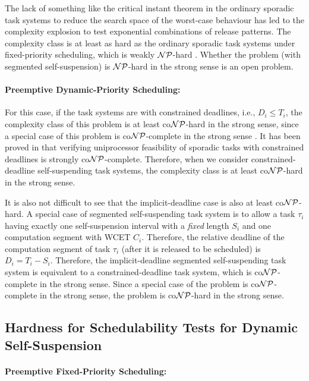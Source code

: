 The lack of something like the critical instant theorem in the ordinary sporadic task systems to reduce the search space of the worst-case behaviour has led to the complexity explosion to test exponential combinations of release patterns. The complexity class is at least as hard as the ordinary sporadic task systems under fixed-priority scheduling, which is weakly ${\cal NP}$-hard  \cite{EisenbrandR08}. Whether the problem (with segmented self-suspension) is ${\cal NP}$-hard in the strong sense is an open problem.

\paragraph{Preemptive Dynamic-Priority Scheduling:} 
For this case, if the task systems are with constrained deadlines, i.e., $D_i \leq T_i$, the complexity class of this problem is at least co${\cal NP}$-hard in the strong sense, since a special case of this problem is co${\cal NP}$-complete in the strong sense \cite{DBLP:conf/ecrts/Ekberg015}. It has been proved in \cite{DBLP:conf/ecrts/Ekberg015} that verifying uniprocessor feasibility of sporadic tasks with constrained deadlines is strongly co${\cal NP}$-complete.  Therefore, when we consider constrained-deadline self-suspending task systems, the complexity class is at least co${\cal NP}$-hard in the strong sense.

It is also not difficult to see that the implicit-deadline case is also at least co${\cal NP}$-hard.  A special case of segmented self-suspending task system is to allow a task $\tau_i$ having exactly one self-suspension interval with a \emph{fixed} length $S_i$ and one computation segment with WCET $C_i$. Therefore, the relative deadline of the computation segment of task $\tau_i$ (after it is released to be scheduled) is $D_i = T_i-S_i$. Therefore, the implicit-deadline segmented self-suspending task system is equivalent to a constrained-deadline task system, which is co${\cal NP}$-complete in the strong sense. Since a special case of the problem is co${\cal NP}$-complete in the strong sense, the problem is co${\cal NP}$-hard in the strong sense.


\subsection{Hardness for Schedulability Tests for Dynamic Self-Suspension}
\paragraph{Preemptive Fixed-Priority Scheduling:}   


